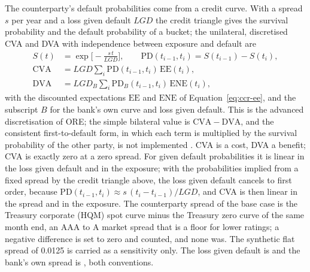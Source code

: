 The counterparty's default probabilities come from a credit curve. With a spread $s$ per year and a loss given default $LGD$ the credit triangle gives the survival probability and the default probability of a bucket; the unilateral, discretised CVA and DVA with independence between exposure and default are
\begin{equation}
\begin{aligned}
S(t)&=\exp\!\Big[-\frac{s\,t}{LGD}\Big],\qquad \mathrm{PD}(t_{i-1},t_i)=S(t_{i-1})-S(t_i),\\
\mathrm{CVA}&=LGD\sum_i\mathrm{PD}(t_{i-1},t_i)\,\mathrm{EE}(t_i),\\
\mathrm{DVA}&=LGD_B\sum_i\mathrm{PD}_B(t_{i-1},t_i)\,\mathrm{ENE}(t_i),
\end{aligned}
\label{eq:ccr-cva}
\end{equation}
with the discounted expectations $\mathrm{EE}$ and $\mathrm{ENE}$ of Equation~\ref{eq:ccr-ee}, and the subscript $B$ for the bank's own curve and loss given default. This is the advanced discretisation of ORE; the simple bilateral value is $\mathrm{CVA}-\mathrm{DVA}$, and the consistent first-to-default form, in which each term is
multiplied by the survival probability of the other party, is not implemented \citep{ccr:brigo2013,ccr:gregory2020}. CVA is a cost, DVA a benefit; CVA is exactly zero at a zero spread. For given default probabilities it is linear in the loss given default and in the exposure; with the probabilities implied from a fixed spread by the credit triangle above, the loss given default cancels to first order, because $\mathrm{PD}(t_{i-1},t_i)\approx s\,(t_i-t_{i-1})/LGD$, and CVA is then linear in the spread and in the exposure. The counterparty spread of the base case is the Treasury corporate (HQM) spot curve minus the Treasury zero curve of the same month end, an AAA to A market spread that is a floor for
lower ratings; a negative difference is set to zero and counted, and none was. The synthetic flat spread of 0.0125 is carried as a sensitivity only. The loss given default is \ccrCpLgd{} and the bank's own spread is \ccrBankSpread, both conventions.

